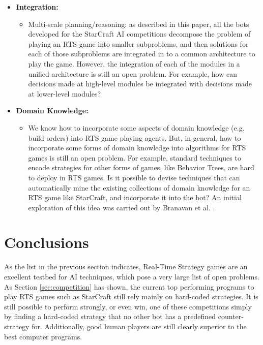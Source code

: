 \documentclass[journal]{IEEEtran}
\begin{document}
\begin{itemize}
\item {\bf Integration:}
\begin{itemize}
\item Multi-scale planning/reasoning: as described in this paper, all the bots developed for the StarCraft AI competitions decompose the problem of playing an RTS game into smaller subproblems, and then solutions for each of those subproblems are integrated in to a common architecture to play the game. However, the integration of each of the modules in a unified architecture is still an open problem. For example, how can decisions made at high-level modules be integrated with decisions made at lower-level modules? 
\end{itemize}

\item {\bf Domain Knowledge: }
\begin{itemize}
\item We know how to incorporate some aspects of domain knowledge (e.g. build orders) into RTS game playing agents. But, in general, how to incorporate some forms of domain knowledge into algorithms for RTS games is still an open problem. For example, standard techniques to encode strategies for other forms of games, like Behavior Trees, are hard to deploy in RTS games. Is it possible to devise techniques that can automatically mine the existing collections of domain knowledge for an RTS game like StarCraft, and incorporate it into the bot? An initial exploration of this idea was carried out by Branavan et al. \cite{branavan2011learning}.
\end{itemize}
\end{itemize}



%

\section{Conclusions}\label{sec:conclusions}

As the list in the previous section indicates, Real-Time Strategy games are an excellent testbed for AI techniques, which pose a very large list of open problems. As Section \ref{sec:competition} has shown, the current top performing programs to play RTS games such as StarCraft still rely mainly on hard-coded strategies. It is still possible to perform strongly, or even win, one of these competitions simply by finding a hard-coded strategy that no other bot has a predefined counter-strategy for. Additionally, good human players are still clearly superior to the best computer programs.
\end{document}
